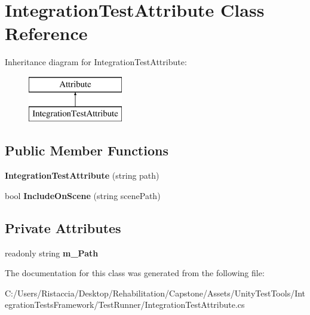 \hypertarget{class_integration_test_attribute}{}\section{Integration\+Test\+Attribute Class Reference}
\label{class_integration_test_attribute}
Inheritance diagram for Integration\+Test\+Attribute\+:\begin{figure}[H]
\begin{center}
\leavevmode
\includegraphics[height=2.000000cm]{class_integration_test_attribute}
\end{center}
\end{figure}
\subsection*{Public Member Functions}
\begin{DoxyCompactItemize}
\item 
\mbox{\label{class_integration_test_attribute_a3f63429175b1ad86e44f31b07f111c99}} 
{\bfseries Integration\+Test\+Attribute} (string path)
\item 
\mbox{\label{class_integration_test_attribute_a022752a716574a9d22df2243ca1b2359}} 
bool {\bfseries Include\+On\+Scene} (string scene\+Path)
\end{DoxyCompactItemize}
\subsection*{Private Attributes}
\begin{DoxyCompactItemize}
\item 
\mbox{\label{class_integration_test_attribute_a82c3ad203afc18d5c9a3257c84085cf2}} 
readonly string {\bfseries m\+\_\+\+Path}
\end{DoxyCompactItemize}


The documentation for this class was generated from the following file\+:\begin{DoxyCompactItemize}
\item 
C\+:/\+Users/\+Ristaccia/\+Desktop/\+Rehabilitation/\+Capstone/\+Assets/\+Unity\+Test\+Tools/\+Integration\+Tests\+Framework/\+Test\+Runner/Integration\+Test\+Attribute.\+cs\end{DoxyCompactItemize}
